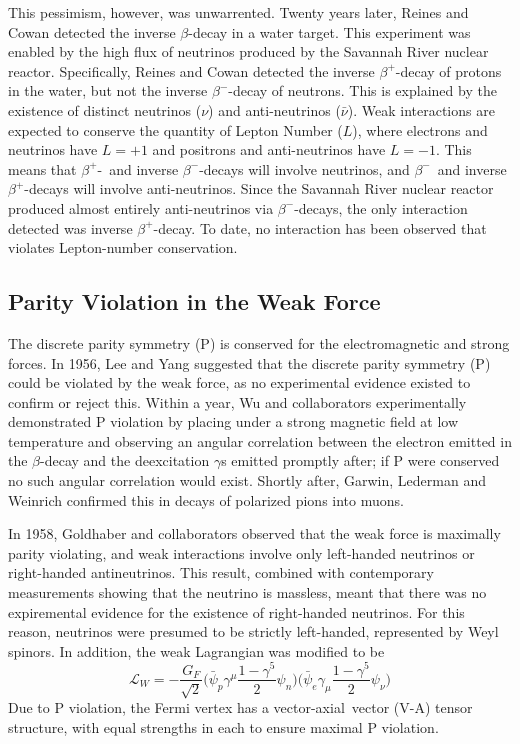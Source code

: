 \documentclass[/main.tex]{subfiles}
\begin{document}
This pessimism, however, was unwarrented.
Twenty years later, Reines and Cowan detected the inverse $\beta$-decay in a water target\cite{Cowan1957}.
This experiment was enabled by the high flux of neutrinos produced by the Savannah River nuclear reactor.
Specifically, Reines and Cowan detected the inverse $\beta^+$-decay of protons in the water, but not the inverse $\beta^-$-decay of neutrons.
This is explained by the existence of distinct neutrinos ($\nu$) and anti-neutrinos ($\bar{\nu}$).
Weak interactions are expected to conserve the quantity of Lepton Number ($L$), where electrons and neutrinos have $L=+1$ and positrons and anti-neutrinos have $L=-1$.
This means that $\beta^+$-~and inverse $\beta^-$-decays will involve neutrinos, and $\beta^-$~and inverse $\beta^+$-decays will involve anti-neutrinos.
Since the Savannah River nuclear reactor produced almost entirely anti-neutrinos via $\beta^-$-decays, the only interaction detected was inverse $\beta^+$-decay.
To date, no interaction has been observed that violates Lepton-number conservation.

\subsection{Parity Violation in the Weak Force}
The discrete parity symmetry (P) is conserved for the electromagnetic and strong forces.
In 1956, Lee and Yang suggested that the discrete parity symmetry (P) could be violated by the weak force, as no experimental evidence existed to confirm or reject this\cite{LeeYang1956}.
Within a year, Wu and collaborators experimentally demonstrated P violation by placing  under a strong magnetic field at low temperature and observing an angular correlation between the electron emitted in the $\beta$-decay and the deexcitation $\gamma$s emitted promptly after; if P were conserved no such angular correlation would exist\cite{Wu1957}.
Shortly after, Garwin, Lederman and Weinrich confirmed this in decays of polarized pions into muons\cite{Garwin1957}.

In 1958, Goldhaber and collaborators observed that the weak force is maximally parity violating, and weak interactions involve only left-handed neutrinos or right-handed antineutrinos\cite{Goldhaber1958}.
This result, combined with contemporary measurements showing that the neutrino is massless\cite{PDG2018}, meant that there was no expiremental evidence for the existence of right-handed neutrinos.
For this reason, neutrinos were presumed to be strictly left-handed, represented by Weyl spinors.
In addition, the weak Lagrangian was modified to be
\begin{equation}
  \mathcal{L}_W=-\frac{G_F}{\sqrt{2}}\big(\bar \psi_p \gamma^\mu \frac{1-\gamma^5}{2} \psi_n\big)\big(\bar \psi_e \gamma_\mu \frac{1-\gamma^5}{2} \psi_\nu\big)
\end{equation}
Due to P violation, the Fermi vertex has a vector-axial~vector (V-A) tensor structure, with equal strengths in each to ensure maximal P violation.
\end{document}
